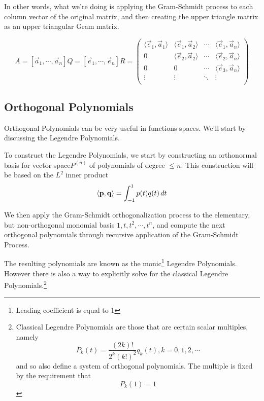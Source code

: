         In other words, what we're doing is applying the Gram-Schmidt process to each column vector of the original matrix, and then creating the upper triangle matrix as an upper triangular Gram matrix.

            \[
                A = [\vec{a}_1, \cdots, \vec{a}_n]
                Q = [\vec{e}_1, \cdots, \vec{e}_n]
                R = \begin{pmatrix}
                        \langle \vec{e}_1, \vec{a}_1 \rangle & \langle \vec{e}_1, \vec{a}_2 \rangle & \cdots & \langle \vec{e}_1, \vec{a}_n \rangle\\
                        0 & \langle \vec{e}_2, \vec{a}_2 \rangle & \cdots & \langle \vec{e}_2, \vec{a}_n \rangle\\
                        0 & 0 & \cdots & \langle \vec{e}_3, \vec{a}_n \rangle\\
                        \vdots & \vdots & \ddots & \vdots\\
                    \end{pmatrix}
            \]

    \subsection{Orthogonal Polynomials}
    Orthogonal Polynomials can be very useful in functions spaces. We'll start by discussing the Legendre Polynomials.

    To construct the Legendre Polynomials, we start by constructing an orthonormal basis for vector space$P^{(n)}$ of polynomials of degree $\le n$. This construction will be based on the $L^2$ inner product
        \[ \left\langle \mathbf{p}, \mathbf{q} \right\rangle = \int^1_{-1}p(t)q(t) \, dt \]

    We then apply the Gram-Schmidt orthogonalization process to the elementary, but non-orthogonal monomial basis $1, t, t^2, \cdots, t^n$, and compute the next orthogonal polynomials through recursive application of the Gram-Schmidt Process.

    The resulting polynomials are known as the monic\footnote{Leading coefficient is equal to 1} Legendre Polynomials. However there is also a way to explicitly solve for the classical Legendre Polynomials.\footnote{Classical Legendre Polynomials are those that are certain scalar multiples, namely \[ P_k(t) = \frac{(2k)!}{2^k (k!)^2} q_k(t), k = 0, 1, 2, \cdots \] and so also define a system of orthogonal polynomials. The multiple is fixed by the requirement that \[ P_k(1) = 1 \]}

